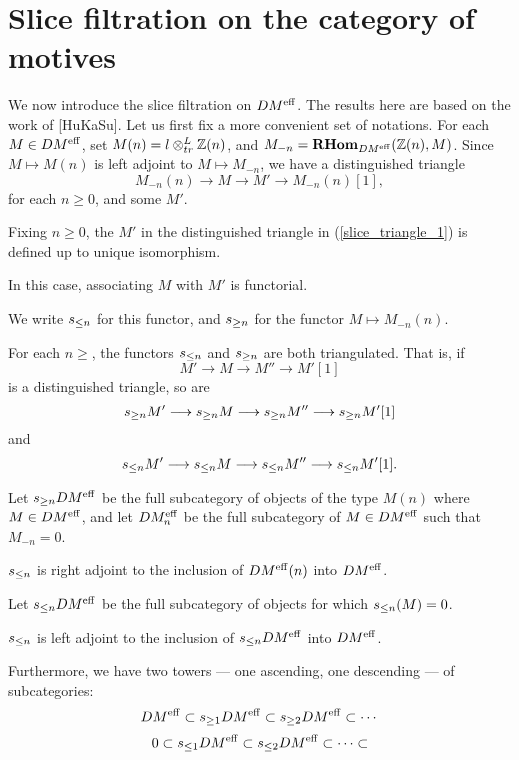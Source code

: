 \section{Slice filtration on the category of motives}

We now introduce the slice filtration on $DM^{\mathrm{eff}}$. The results here
are based on the work of [HuKaSu]. Let us first fix a more 
convenient set of notations. For each $M \in DM^{\mathrm{eff}}$, set $M(n) = 
l \otimes^{L}_{tr} \mathbb{Z}(n)$, and $M_{-n} = \mathbf{RHom}_{DM^{\mathrm{eff}}}(\mathbb{Z}(n), M)$. Since $M \mapsto
M(n)$ is left adjoint to $M \mapsto M_{-n}$, we have a 
distinguished triangle 
\begin{equation}\label{slice_triangle_1}
M_{-n}(n) \to M \to M' \to M_{-n}(n)[1],
\end{equation}
for each $n \geq 0$, and some $M'$. 

\begin{prop}
Fixing $n \geq 0$, the $M'$ in the distinguished triangle in
(\ref{slice_triangle_1}) is defined up to unique isomorphism.

In this case, associating $M$ with $M'$ is functorial.
\end{prop}

We write $s_{\leq n}$ for this functor, and $s_{\geq n}$ for the
functor $M \mapsto M_{-n}(n)$.

\begin{prop}
For each $n \geq$, the functors $s_{\leq n}$ and $s_{\geq n}$ are
both triangulated. That is, if
\[
M' \to M \to M'' \to M'[1]
\]
is a distinguished triangle, so are
\[
s_{\geq n}M' \longrightarrow s_{\geq n}M \longrightarrow s_{\geq n}M'' \longrightarrow s_{\geq n}M'[1]
\]
and
\[
s_{\leq n}M' \longrightarrow s_{\leq n}M \longrightarrow s_{\leq n}M'' \longrightarrow s_{\leq n}M'[1].
\]
\end{prop}

Let $s_{\geq n}DM^{\mathrm{eff}}$ be the full subcategory of objects of the 
type $M(n)$ where $M \in DM^{\mathrm{eff}}$, and let $DM^{\mathrm{eff}}_{n}$ be the full 
subcategory of $M \in DM^{\mathrm{eff}}$ such that $M_{-n} = 0$.

\begin{prop}
$s_{\leq n}$ is right adjoint to the inclusion of $DM^{\mathrm{eff}}(n)$ into 
$DM^{\mathrm{eff}}$. 
\end{prop}

Let $s_{\leq n}DM^{\mathrm{eff}}$ be the full subcategory of objects for which
$s_{\leq n}(M) = 0$.

\begin{prop}
$s_{\leq n}$ is left adjoint to the inclusion of $s_{\leq n}DM^{\mathrm{eff}}$ 
into $DM^{\mathrm{eff}}$. 
\end{prop}

Furthermore, we have two towers --- one ascending, one descending 
--- of subcategories:
\begin{equation}
DM^{\mathrm{eff}} \subset s_{\geq 1}DM^{\mathrm{eff}} \subset s_{\geq 2}DM^{\mathrm{eff}} \subset \cdots \\
\end{equation}
\vskip 5pt
\begin{equation}
0 \subset s_{\leq 1}DM^{\mathrm{eff}} \subset s_{\leq 2}DM^{\mathrm{eff}} \subset \cdots \subset
\end{equation}

